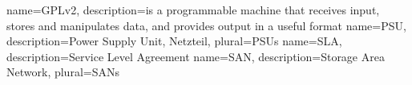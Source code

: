 	{
 	 name=GPLv2,
 	 description={is a programmable machine that receives input,
               stores and manipulates data, and provides
               output in a useful format}
	}
	{
	name=PSU,
	description={Power Supply Unit, Netzteil},
	plural=PSUs
	}
	{
	name=SLA,
	description={Service Level Agreement}
	}
	{
	name=SAN,
	description={Storage Area Network},
	plural=SANs
	}

